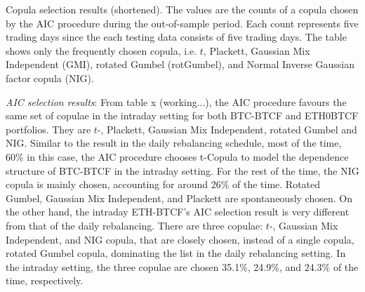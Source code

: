 \documentclass[11pt,a4paper,english]{article}
\begin{document}
\begin{table}[t]

 \caption{Copula selection results (shortened).
        The values are the counts of a copula chosen by the AIC procedure during the out-of-sample period.
        Each count represents five trading days since the each testing data consists of five trading days.
        The table shows only the frequently chosen copula, i.e. $t$, Plackett, Gaussian Mix Independent (GMI), rotated Gumbel (rotGumbel), and
        Normal Inverse Gaussian factor copula (NIG).
        }
    \label{tab:copulasection_intraday}
\end{table}

\textit{AIC selection results}: From table x (working...), the AIC procedure favours the same set of copulae in the intraday setting for both BTC-BTCF and ETH0BTCF portfolios.
They are $t$-, Plackett, Gaussian Mix Independent, rotated Gumbel and NIG.
Similar to the result in the daily rebalancing schedule, most of the time, 60\% in this case,
the AIC procedure chooses t-Copula to model the dependence structure of BTC-BTCF in the intraday setting.
For the rest of the time, the NIG copula is mainly chosen, accounting for around 26\% of the time.
Rotated Gumbel, Gaussian Mix Independent, and Plackett are spontaneously chosen.
On the other hand, the intraday ETH-BTCF’s AIC selection result is very different from that of the daily rebalancing.
There are three copulae: $t$-, Gaussian Mix Independent, and NIG copula, that are closely chosen, instead of a single copula, rotated Gumbel copula, dominating the list in the daily rebalancing setting.
In the intraday setting, the three copulae are chosen 35.1\%, 24.9\%, and 24.3\% of the time, respectively.
\end{document}
